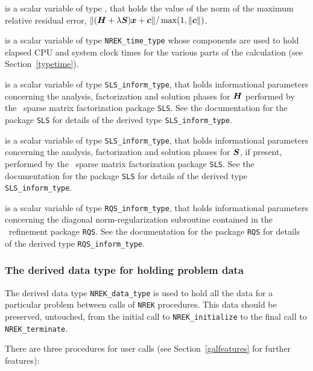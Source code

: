 \documentclass{galahad}
\newcommand{\packagename}{NREK}
\begin{document}
\begin{description}
 is a scalar variable of type \realdp, that holds the value 
of the norm of the maximum relative residual error, 
$\|({\bm{H}}+\lambda{\bm{S}}) {\bm{x}} + {\bm{c}}\|/\max(1,\|{\bm{c}}\|)$.

 is a scalar variable of type {\tt \packagename\_time\_type}
whose components are used to hold elapsed CPU  and system clock times for the
various parts of the calculation (see Section~\ref{typetime}).

 is a scalar variable of type {\tt SLS\_inform\_type},
that holds informational parameters concerning the analysis, factorization
and solution phases for ${\bm{H}}$ performed by
the \galahad\ sparse matrix factorization package {\tt SLS}.
See the documentation for the package {\tt SLS} for details of the
derived type {\tt SLS\_inform\_type}.

 is a scalar variable of type {\tt SLS\_inform\_type},
that holds informational parameters concerning the analysis, factorization
and solution phases for ${\bm{S}}$, if present, performed by
the \galahad\ sparse matrix factorization package {\tt SLS}.
See the documentation for the package {\tt SLS} for details of the
derived type {\tt SLS\_inform\_type}.

 is a scalar variable of type {\tt RQS\_inform\_type},
that holds informational parameters concerning the 
diagonal norm-regularization subroutine
contained in the \galahad\ refinement package {\tt RQS}.
See the documentation for the package {\tt RQS} for details of the
derived type {\tt RQS\_inform\_type}.


\end{description}


\subsubsection{The derived data type for holding problem data}\label{typedata}
The derived data type
{\tt \packagename\_data\_type}
is used to hold all the data for a particular problem between calls of
{\tt \packagename} procedures.
This data should be preserved, untouched, from the initial call to
{\tt \packagename\_initialize}
to the final call to
{\tt \packagename\_terminate}.


\galarguments
There are three procedures for user calls
(see Section~\ref{galfeatures} for further features):
\end{document}
